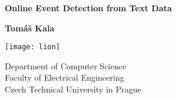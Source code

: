 \begin{titlepage}
	\begin{center}
		\vspace*{1cm}
		
		\Huge
		\textbf{Online Event Detection from Text Data}
		
		\vspace{1.5cm}
		
		\textbf{Tomáš Kala}

		\texttt{[image: lion]}

		\Large
		Department of Computer Science\\
		Faculty of Electrical Engineering\\
		Czech Technical University in Prague
		
		\vfill
	\end{center}
\end{titlepage}